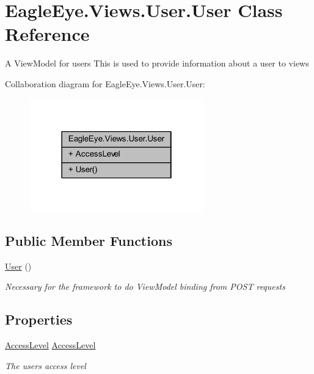 \hypertarget{class_eagle_eye_1_1_views_1_1_user_1_1_user}{}\section{Eagle\+Eye.\+Views.\+User.\+User Class Reference}
\label{class_eagle_eye_1_1_views_1_1_user_1_1_user}


A View\+Model for users This is used to provide information about a user to views  




Collaboration diagram for Eagle\+Eye.\+Views.\+User.\+User\+:
\nopagebreak
\begin{figure}[H]
\begin{center}
\leavevmode
\includegraphics[width=214pt]{class_eagle_eye_1_1_views_1_1_user_1_1_user__coll__graph}
\end{center}
\end{figure}
\subsection*{Public Member Functions}
\begin{DoxyCompactItemize}
\item 
\mbox{\hyperlink{class_eagle_eye_1_1_views_1_1_user_1_1_user_afaf7ca813d3573cb9a84ac392cfc5901}{User}} ()
\begin{DoxyCompactList}\small\item\em Necessary for the framework to do View\+Model binding from P\+O\+ST requests \end{DoxyCompactList}\end{DoxyCompactItemize}
\subsection*{Properties}
\begin{DoxyCompactItemize}
\item 
\mbox{\hyperlink{namespace_eagle_eye_1_1_views_1_1_user_a5ec08150416703595770d50460878d89}{Access\+Level}} \mbox{\hyperlink{class_eagle_eye_1_1_views_1_1_user_1_1_user_ad00af0bd442d99c28dd3068240226053}{Access\+Level}}
\begin{DoxyCompactList}\small\item\em The user\textquotesingle{}s access level \end{DoxyCompactList}\end{DoxyCompactItemize}


